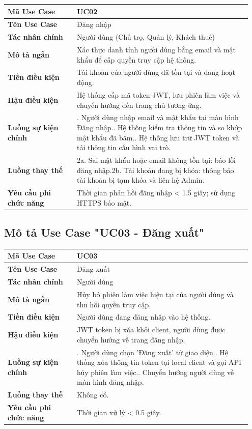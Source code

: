 \begin{longtable}[]{@{}>{\RaggedRight\arraybackslash}p{0.27\linewidth}>{\RaggedRight\arraybackslash}p{0.68\linewidth}@{}}
\toprule
\textbf{Mã Use Case} & UC02\tabularnewline
\midrule
\endhead
\textbf{Tên Use Case} & Đăng nhập\tabularnewline
\textbf{Tác nhân chính} & Người dùng (Chủ trọ, Quản lý, Khách
thuê)\tabularnewline
\textbf{Mô tả ngắn} & Xác thực danh tính người dùng bằng email và mật
khẩu để cấp quyền truy cập hệ thống.\tabularnewline
\textbf{Tiền điều kiện} & Tài khoản của người dùng đã tồn tại và đang
hoạt động.\tabularnewline
\textbf{Hậu điều kiện} & Hệ thống cấp mã token JWT, lưu phiên làm việc
và chuyển hướng đến trang chủ tương ứng.\tabularnewline
\textbf{Luồng sự kiện chính} & 1. Người dùng nhập
email và mật khẩu tại màn hình Đăng nhập.\newline 2. Hệ thống kiểm
tra thông tin và so khớp mật khẩu đã băm.\newline 3. Hệ thống lưu
trữ JWT token và tải thông tin cấu hình vai trò.\tabularnewline
\textbf{Luồng thay thế} & 2a. Sai mật khẩu hoặc email
không tồn tại: báo lỗi đăng nhập.\newline 2b. Tài khoản đang bị
khóa: thông báo tài khoản bị tạm khóa và liên hệ Admin.\tabularnewline
\textbf{Yêu cầu phi chức năng} & Thời gian phản hồi đăng nhập
\textless{} 1.5 giây; sử dụng HTTPS bảo mật.\tabularnewline
\bottomrule
\end{longtable}

\subsection{Mô tả Use Case "UC03 - Đăng xuất"}

\begin{longtable}[]{@{}>{\RaggedRight\arraybackslash}p{0.27\linewidth}>{\RaggedRight\arraybackslash}p{0.68\linewidth}@{}}
\toprule
\textbf{Mã Use Case} & UC03\tabularnewline
\midrule
\endhead
\textbf{Tên Use Case} & Đăng xuất\tabularnewline
\textbf{Tác nhân chính} & Người dùng\tabularnewline
\textbf{Mô tả ngắn} & Hủy bỏ phiên làm việc hiện tại của người dùng và
thu hồi quyền truy cập.\tabularnewline
\textbf{Tiền điều kiện} & Người dùng đang đăng nhập vào hệ
thống.\tabularnewline
\textbf{Hậu điều kiện} & JWT token bị xóa khỏi client, người dùng được
chuyển hướng về trang đăng nhập.\tabularnewline
\textbf{Luồng sự kiện chính} & 1. Người dùng chọn
'Đăng xuất' từ giao diện.\newline 2. Hệ thống xóa thông tin token
tại local client và gọi API hủy phiên làm việc.\newline 3. Chuyển
hướng người dùng về màn hình đăng nhập.\tabularnewline
\textbf{Luồng thay thế} & Không có.\tabularnewline
\textbf{Yêu cầu phi chức năng} & Thời gian xử lý \textless{} 0.5
giây.\tabularnewline
\bottomrule
\end{longtable}

